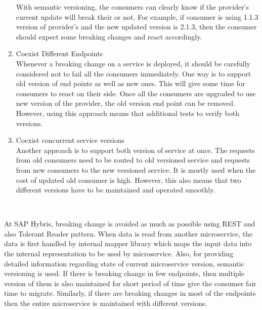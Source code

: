 \begin{enumerate}
With semantic versioning, the consumers can clearly know if the provider's current update will break their  or not. For example, if consumer is using 1.1.3 version of provider's  and the new updated version is 2.1.3, then the consumer should expect some breaking changes and react accordingly.
\item Coexist Different Endpoints \\ Whenever a breaking change on a service is deployed, it should be carefully considered not to fail all the consumers immediately. One way is to support old version of end points as well as new ones. This will give some time for consumers to react on their side. Once all the consumers are upgraded to use new version of the provider, the old version end point can be removed. However, using this approach means that additional tests to verify both versions.
\item Coexist concurrent service versions \\ Another approach is to support both version of service at once. The requests from old consumers need to be routed to old versioned service and requests from new consumers to the new versioned service. It is mostly used when the cost of updated old consumer is high. However, this also means that two different versions have to be maintained and operated smoothly.
\end{enumerate}
\\
\begin{shaded}
At SAP Hybris, breaking change is avoided as much as possible using \acrshort{REST} and also Tolerant Reader pattern. When data is read from another microservice, the data is first handled by internal mapper library which maps the input data into the internal representation to be used by microservice. Also, for providing detailed information regarding state of current microservice version, semantic versioning is used. If there is breaking change in few endpoints, then multiple version of them is also maintained for short period of time give the consumer fair time to migrate. Similarly, if there are breaking changes in most of the endpoints then the entire microservice is maintained with different versions.
\end{shaded}
